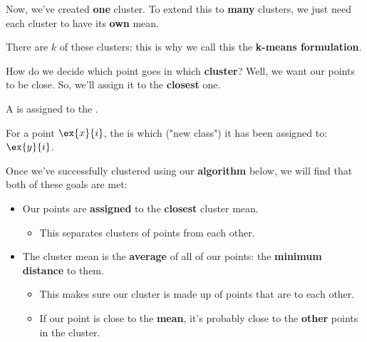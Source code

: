         Now, we've created \textbf{one} cluster. To extend this to \textbf{many} clusters, we just need each cluster to have its \textbf{own} mean.
        
        There are $k$ of these clusters: this is why we call this the \textbf{k-means formulation}.
        
        How do we decide which point goes in which \textbf{cluster}? Well, we want our points to be close. So, we'll assign it to the \textbf{closest} one.\\
        
        \begin{concept}
            A  is assigned to the  .
            
            For a point $\ex{x}{i}$, the  is which  ("new class") it has been assigned to: $\ex{y}{i}$.
        \end{concept}
        
        Once we've successfully clustered using our \textbf{algorithm} below, we will find that both of these goals are met:
        
        \begin{itemize}
            \item Our points are \textbf{assigned} to the \textbf{closest} cluster mean.
            
                \begin{itemize}
                    \item This separates  clusters of points from each other.
                \end{itemize}
            
            \item The cluster mean is the \textbf{average} of all of our points: the \textbf{minimum distance} to them.
            
                \begin{itemize}
                    \item This makes sure our cluster is made up of points that are  to each other.
                    
                    \item If our point is close to the \textbf{mean}, it's probably close to the \textbf{other} points in the cluster.
                \end{itemize}
        \end{itemize}
        
